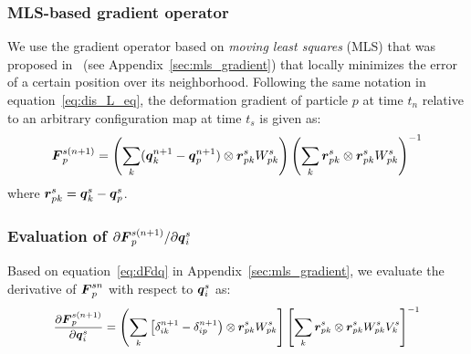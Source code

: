 \subsubsection{MLS-based gradient operator}
We use the gradient operator based on \emph{moving least squares} (MLS) that was proposed in~\cite{Xue:2019:NL_L} (see Appendix~\ref{sec:mls_gradient}) that locally minimizes the error of a certain position over its neighborhood.  
Following the same notation in equation~\eqref{eq:dis_L_eq}, the deformation gradient of particle $p$ at time $t_n$ relative to an arbitrary configuration map at time $t_s$ is given as:
\begin{eqnarray}
    \boldsymbol{F}_p^{s(n+1)}=\left(\sum_{k}(\boldsymbol{q}_k^{n+1}-\boldsymbol{q}_p^{n+1})\otimes \boldsymbol{r}_{pk}^s W_{pk}^s\right)\left(\sum_{k}\boldsymbol{r}_{pk}^s\otimes\boldsymbol{r}_{pk}^s W_{pk}^s\right)^{-1}
\label{eq:gradient_qp_0s}
\end{eqnarray}
where $\boldsymbol{r}_{pk}^s=\boldsymbol{q}_k^s-\boldsymbol{q}_p^s$.
\subsubsection{Evaluation of $\partial\boldsymbol{F}_p^{s(n+1)}/\partial\boldsymbol{q}_i^s$}
Based on equation~\eqref{eq:dFdq} in Appendix~\ref{sec:mls_gradient}, we evaluate the derivative of $\boldsymbol{F}_p^{sn}$ with respect to $\boldsymbol{q}_i^s$ as: 
\begin{eqnarray}
\begin{small}
 \frac{\p \bs{F}_p^{s(n+1)}}{\p\bs{q}_i^s}=\left(\sum_{k}\left[\delta_{ik}^{n+1}-\delta_{ip}^{n+1}\right)\otimes \bs{r}_{pk}^s W_{pk}^s \right]\left[\sum_{k}\bs{r}_{pk}^s\otimes \bs{r}_{pk}^s W_{pk}^s V_k^s \right]^{-1}
 \end{small}
 \label{eq:dFjdqi}
\end{eqnarray}
